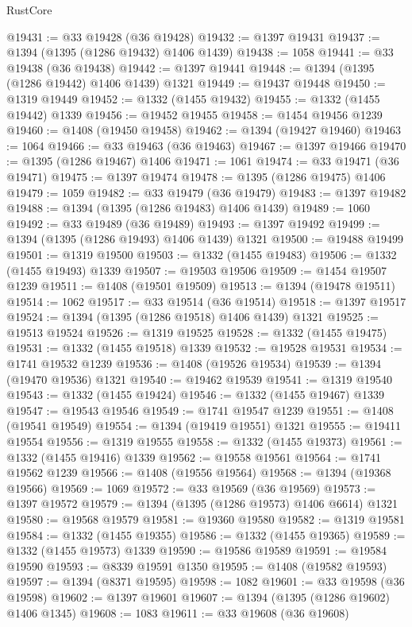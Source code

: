 \begin{lexlean}{RustCore}
\begin{coremodule}
@19431 := @33 @19428 (@36 @19428)
@19432 := @1397 @19431
@19437 := @1394 (@1395 (@1286 @19432) @1406 @1439)
@19438 := 1058
@19441 := @33 @19438 (@36 @19438)
@19442 := @1397 @19441
@19448 := @1394 (@1395 (@1286 @19442) @1406 @1439) @1321
@19449 := @19437 @19448
@19450 := @1319 @19449
@19452 := @1332 (@1455 @19432)
@19455 := @1332 (@1455 @19442) @1339
@19456 := @19452 @19455
@19458 := @1454 @19456 @1239
@19460 := @1408 (@19450 @19458)
@19462 := @1394 (@19427 @19460)
@19463 := 1064
@19466 := @33 @19463 (@36 @19463)
@19467 := @1397 @19466
@19470 := @1395 (@1286 @19467) @1406
@19471 := 1061
@19474 := @33 @19471 (@36 @19471)
@19475 := @1397 @19474
@19478 := @1395 (@1286 @19475) @1406
@19479 := 1059
@19482 := @33 @19479 (@36 @19479)
@19483 := @1397 @19482
@19488 := @1394 (@1395 (@1286 @19483) @1406 @1439)
@19489 := 1060
@19492 := @33 @19489 (@36 @19489)
@19493 := @1397 @19492
@19499 := @1394 (@1395 (@1286 @19493) @1406 @1439) @1321
@19500 := @19488 @19499
@19501 := @1319 @19500
@19503 := @1332 (@1455 @19483)
@19506 := @1332 (@1455 @19493) @1339
@19507 := @19503 @19506
@19509 := @1454 @19507 @1239
@19511 := @1408 (@19501 @19509)
@19513 := @1394 (@19478 @19511)
@19514 := 1062
@19517 := @33 @19514 (@36 @19514)
@19518 := @1397 @19517
@19524 := @1394 (@1395 (@1286 @19518) @1406 @1439) @1321
@19525 := @19513 @19524
@19526 := @1319 @19525
@19528 := @1332 (@1455 @19475)
@19531 := @1332 (@1455 @19518) @1339
@19532 := @19528 @19531
@19534 := @1741 @19532 @1239
@19536 := @1408 (@19526 @19534)
@19539 := @1394 (@19470 @19536) @1321
@19540 := @19462 @19539
@19541 := @1319 @19540
@19543 := @1332 (@1455 @19424)
@19546 := @1332 (@1455 @19467) @1339
@19547 := @19543 @19546
@19549 := @1741 @19547 @1239
@19551 := @1408 (@19541 @19549)
@19554 := @1394 (@19419 @19551) @1321
@19555 := @19411 @19554
@19556 := @1319 @19555
@19558 := @1332 (@1455 @19373)
@19561 := @1332 (@1455 @19416) @1339
@19562 := @19558 @19561
@19564 := @1741 @19562 @1239
@19566 := @1408 (@19556 @19564)
@19568 := @1394 (@19368 @19566)
@19569 := 1069
@19572 := @33 @19569 (@36 @19569)
@19573 := @1397 @19572
@19579 := @1394 (@1395 (@1286 @19573) @1406 @6614) @1321
@19580 := @19568 @19579
@19581 := @19360 @19580
@19582 := @1319 @19581
@19584 := @1332 (@1455 @19355)
@19586 := @1332 (@1455 @19365)
@19589 := @1332 (@1455 @19573) @1339
@19590 := @19586 @19589
@19591 := @19584 @19590
@19593 := @8339 @19591 @1350
@19595 := @1408 (@19582 @19593)
@19597 := @1394 (@8371 @19595)
@19598 := 1082
@19601 := @33 @19598 (@36 @19598)
@19602 := @1397 @19601
@19607 := @1394 (@1395 (@1286 @19602) @1406 @1345)
@19608 := 1083
@19611 := @33 @19608 (@36 @19608)

\end{coremodule}
\end{lexlean}
